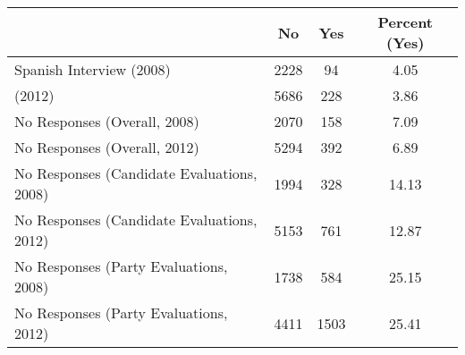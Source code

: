 \begin{table}[ht]
\centering
\begin{tabular}{lccc}
  \hline
 & No & Yes & Percent (Yes) \\ 
  \hline
Spanish Interview (2008) & 2228 & 94 & 4.05 \\ 
  (2012) & 5686 & 228 & 3.86 \\ 
  No Responses (Overall, 2008) & 2070 & 158 & 7.09 \\ 
  No Responses (Overall, 2012) & 5294 & 392 & 6.89 \\ 
  No Responses (Candidate Evaluations, 2008) & 1994 & 328 & 14.13 \\ 
  No Responses (Candidate Evaluations, 2012) & 5153 & 761 & 12.87 \\ 
  No Responses (Party Evaluations, 2008) & 1738 & 584 & 25.15 \\ 
  No Responses (Party Evaluations, 2012) & 4411 & 1503 & 25.41 \\ 
   \hline
\end{tabular}
\end{table}

